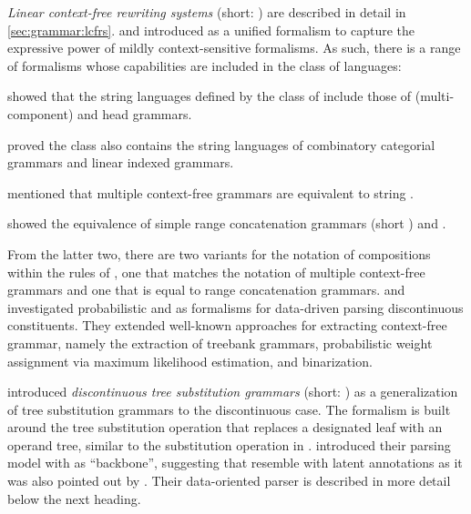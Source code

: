 \documentclass[../document.tex]{subfiles}
\begin{document}
    \emph{Linear context-free rewriting systems} (short: ) are described in detail in \cref{sec:grammar:lcfrs}.
     and \citet{Weir88} introduced  as a unified formalism to capture the expressive power of mildly context-sensitive formalisms.
    As such, there is a range of formalisms whose capabilities are included in the class of  languages:
    \begin{compactitem}
        \item \citet{VijWeiJos87} showed that the string languages defined by the class of  include those of (multi-component)  and head grammars.
        \item \citet{vijay1994equivalence} proved the class also contains the string languages of combinatory categorial grammars and linear indexed grammars.
        \item \citet{SekMatFujKas91} mentioned that multiple context-free grammars are equivalent to string .
        \item \citet{boullier1998proposal} showed the equivalence of simple range concatenation grammars (short ) and .
    \end{compactitem}
    From the latter two, there are two variants for the notation of compositions within the rules of , one that matches the notation of multiple context-free grammars and one that is equal to range concatenation grammars.
     and \citet{MailKal10} investigated probabilistic  and  as formalisms for data-driven parsing discontinuous constituents.
    They extended well-known approaches for extracting context-free grammar, namely the extraction of treebank grammars, probabilistic weight assignment via maximum likelihood estimation, and binarization.

     introduced \emph{discontinuous tree substitution grammars} (short: ) as a generalization of tree substitution grammars to the discontinuous case.
    The formalism is built around the tree substitution operation that replaces a designated leaf with an operand tree, similar to the substitution operation in .
     introduced their parsing model with  as ``backbone'', suggesting that  resemble  with latent annotations as it was also pointed out by \citet[Section~8.5.1]{Geb20}.
    Their data-oriented parser is described in more detail below the next heading.
\end{document}
